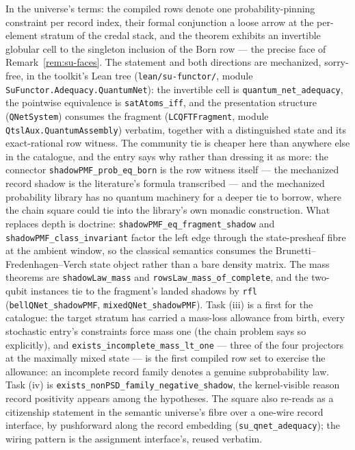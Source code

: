 In the universe's terms: the compiled rows denote one
probability-pinning constraint per record index, their formal
conjunction a loose arrow at the per-element stratum of the credal
stack, and the theorem exhibits an invertible globular cell to the
singleton inclusion of the Born row --- the precise face of
Remark~\ref{rem:su-faces}. The statement and both directions are
mechanized, sorry-free, in the toolkit's Lean tree
(\texttt{lean/su-functor/}, module
\texttt{SuFunctor.Adequacy.QuantumNet}): the invertible cell is
\texttt{quantum\_net\_adequacy}, the pointwise equivalence is
\texttt{satAtoms\_iff}, and the presentation structure
(\texttt{QNetSystem}) consumes the fragment (\texttt{LCQFTFragment},
module \texttt{QtslAux.QuantumAssembly}) verbatim, together
with a distinguished state and its exact-rational row witness. The
community tie is cheaper here than anywhere else in the catalogue,
and the entry says why rather than dressing it as more: the
connector \texttt{shadowPMF\_prob\_eq\_born} is the row witness
itself --- the mechanized record shadow is the literature's formula
transcribed --- and the mechanized probability library has no
quantum machinery for a deeper tie to borrow, where the chain square
could tie into the library's own monadic construction. What replaces
depth is doctrine: \texttt{shadowPMF\_eq\_fragment\_shadow} and
\texttt{shadowPMF\_class\_invariant} factor the left edge through
the state-presheaf fibre at the ambient window, so the classical
semantics consumes the Brunetti--Fredenhagen--Verch state object
rather than a bare density matrix. The mass theorems are
\texttt{shadowLaw\_mass} and \texttt{rowsLaw\_mass\_of\_complete},
and the two-qubit instances tie to the fragment's landed shadows by
\texttt{rfl} (\texttt{bellQNet\_shadowPMF},
\texttt{mixedQNet\_shadowPMF}). Task (iii) is a first for the
catalogue: the target stratum has carried a mass-loss allowance from
birth, every stochastic entry's constraints force mass one (the
chain problem says so explicitly), and
\texttt{exists\_incomplete\_mass\_lt\_one} --- three of the four
projectors at the maximally mixed state --- is the first compiled
row set to exercise the allowance: an incomplete record family
denotes a genuine subprobability law. Task (iv) is
\texttt{exists\_nonPSD\_family\_negative\_shadow}, the
kernel-visible reason record positivity appears among the
hypotheses. The square also re-reads as a citizenship statement in
the semantic universe's fibre over a one-wire record interface, by
pushforward along the record embedding
(\texttt{su\_qnet\_adequacy}); the wiring pattern is the assignment
interface's, reused verbatim.

